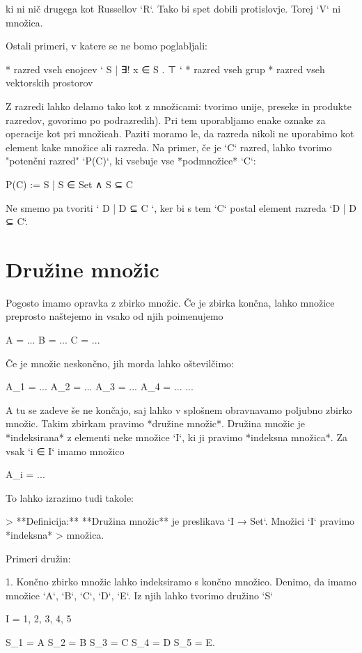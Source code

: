 ki ni nič drugega kot Russellov `R`. Tako bi spet dobili protislovje. Torej `V`
ni množica.

Ostali primeri, v katere se ne bomo poglabljali:

* razred vseh enojcev `{ S | ∃! x ∈ S . ⊤ }`
* razred vseh grup
* razred vseh vektorskih prostorov

Z razredi lahko delamo tako kot z množicami: tvorimo unije, preseke in produkte
razredov, govorimo po podrazredih). Pri tem uporabljamo enake oznake za
operacije kot pri množicah. Paziti moramo le, da razreda nikoli ne uporabimo kot
element kake množice ali razreda. Na primer, če je `C` razred, lahko tvorimo
"potenčni razred" `P(C)`, ki vsebuje vse *podmnožice* `C`:

    P(C) := { S | S ∈ Set ∧ S ⊆ C }

Ne smemo pa tvoriti `{ D | D ⊆ C }`, ker bi s tem `C` postal element razreda `{D | D ⊆ C}`.

\section{Družine množic}

Pogosto imamo opravka z zbirko množic. Če je zbirka končna, lahko množice preprosto
naštejemo in vsako od njih poimenujemo

    A = ...
    B = ...
    C = ...

Če je množic neskončno, jih morda lahko oštevilčimo:

    A_1 = ...
    A_2 = ...
    A_3 = ...
    A_4 = ...
    ...

A tu se zadeve še ne končajo, saj lahko v splošnem obravnavamo poljubno zbirko množic.
Takim zbirkam pravimo *družine množic*. Družina množic je *indeksirana* z elementi
neke množice `I`, ki ji pravimo *indeksna množica*. Za vsak `i ∈ I` imamo množico

    A_i = ...

To lahko izrazimo tudi takole:

> **Definicija:** **Družina množic** je preslikava `I → Set`. Množici `I` pravimo *indeksna*
> množica.

Primeri družin:

1. Končno zbirko množic lahko indeksiramo s končno množico. Denimo, da imamo
   množice `A`, `B`, `C`, `D`, `E`. Iz njih lahko tvorimo družino `S`

        I = {1, 2, 3, 4, 5}

        S_1 = A
        S_2 = B
        S_3 = C
        S_4 = D
        S_5 = E.

